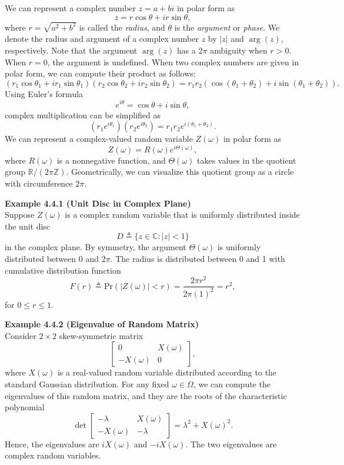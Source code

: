 We can represent a complex number $z = a + bi$ in polar form as
\[
z = r \cos \theta + ir \sin \theta,
\]
where $r = \sqrt{a^2 + b^2}$ is called the \textit{radius}, and $\theta$ is the \textit{argument} or \textit{phase}. We denote the radius and argument of a complex number $z$ by $|z|$ and $\arg(z)$, respectively. Note that the argument $\arg(z)$ has a $2\pi$ ambiguity when $r > 0$. When $r = 0$, the argument is undefined. When two complex numbers are given in polar form, we can compute their product as follows:
\[
(r_1 \cos \theta_1 + ir_1 \sin \theta_1)(r_2 \cos \theta_2 + ir_2 \sin \theta_2) = r_1 r_2 (\cos(\theta_1 + \theta_2) + i \sin(\theta_1 + \theta_2)).
\]
Using Euler's formula
\[
e^{i\theta} = \cos \theta + i \sin \theta,
\]
complex multiplication can be simplified as
\[
(r_1 e^{i\theta_1})(r_2 e^{i\theta_2}) = r_1 r_2 e^{i(\theta_1 + \theta_2)}.
\]
We can represent a complex-valued random variable $Z(\omega)$ in polar form as
\[
Z(\omega) = R(\omega) e^{i\Theta(\omega)},
\]
where $R(\omega)$ is a nonnegative function, and $\Theta(\omega)$ takes values in the quotient group $\mathbb{R}/(2\pi\mathbb{Z})$. Geometrically, we can visualize this quotient group as a circle with circumference $2\pi$.

\textbf{Example 4.4.1 (Unit Disc in Complex Plane)} \\
Suppose $Z(\omega)$ is a complex random variable that is uniformly distributed inside the unit disc
\[
D \triangleq \{z \in \mathbb{C} : |z| < 1\}
\]
in the complex plane. By symmetry, the argument $\Theta(\omega)$ is uniformly distributed between 0 and $2\pi$. The radius is distributed between 0 and 1 with cumulative distribution function
\[
F(r) \triangleq \text{Pr}(|Z(\omega)| < r) = \frac{2\pi r^2}{2\pi (1)^2} = r^2,
\]
for $0 \le r \le 1$.

\textbf{Example 4.4.2 (Eigenvalue of Random Matrix)} \\
Consider $2 \times 2$ skew-symmetric matrix
\[
\begin{bmatrix} 0 & X(\omega) \\ -X(\omega) & 0 \end{bmatrix},
\]
where $X(\omega)$ is a real-valued random variable distributed according to the standard Gaussian distribution. For any fixed $\omega \in \Omega$, we can compute the eigenvalues of this random matrix, and they are the roots of the characteristic polynomial
\[
\det \begin{bmatrix} -\lambda & X(\omega) \\ -X(\omega) & -\lambda \end{bmatrix} = \lambda^2 + X(\omega)^2.
\]
Hence, the eigenvalues are $iX(\omega)$ and $-iX(\omega)$. The two eigenvalues are complex random variables.

